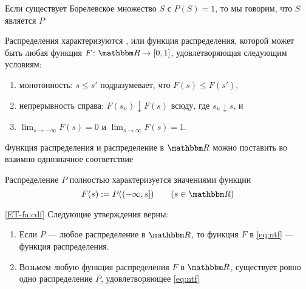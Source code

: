 \begin{frame}

    \vspace{2em}
    Если существует Борелевское множество $S$
    с $P(S) = 1$, то мы говорим, что $S$ является  $P$
    
    \vspace{1em}
    Распределения характеризуются ,
    или функция распределения, которой может быть любая функция $F \colon \RR \to [0, 1]$, удовлетворяющая следующим условиям:
    \begin{enumerate}
        \item монотонность: $s \leq s'$ подразумевает, что $F(s) \leq F(s')$,
        \item непрерывность справа: $F(s_n) \downarrow F(s)$ всюду, где $s_n \downarrow
            s$, и
        \item $\lim_{s \to -\infty} F(s) = 0$ и $\lim_{s \to \infty} F(s) = 1$.
    \end{enumerate}
    
\end{frame}

\begin{frame}

    \vspace{2em}
    Функция распределения и распределение в $\RR$ можно поставить во взаимно однозначное соответствие
    
    Распределение $P$ полностью характеризуется значениями функции
    \begin{equation}
        \label{eq:ntf}
        F(s) := P( (-\infty, s] )
        \qquad (s \in \RR)
    \end{equation}
    
    \vspace{1em}
    \Fact\eqref{ET-fa:cdf}
    Следующие утверждения верны:
    \begin{enumerate}
        \item Если $P$ --- любое распределение в $\RR$, то функция $F$ в
            \eqref{eq:ntf} --- функция распределения.
        \item Возьмем любую функция распределения $F$ в $\RR$, существует ровно одно
            распределение $P$, удовлетворяющее \eqref{eq:ntf}
    \end{enumerate}
    
\end{frame}

